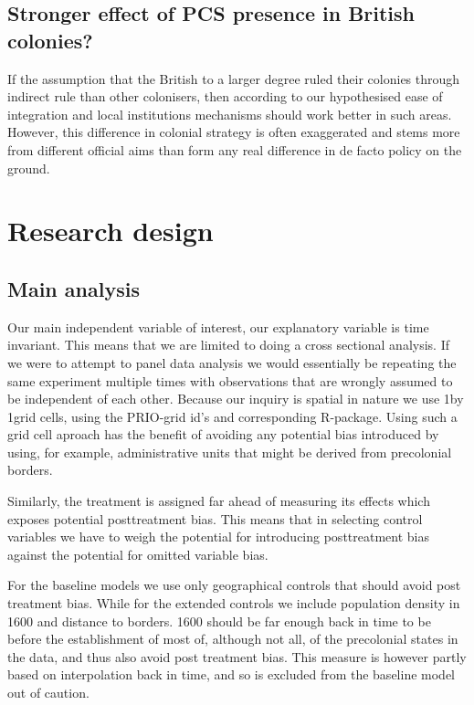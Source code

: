 \documentclass[12pt]{article}
\begin{document}


\subsection{Stronger effect of PCS presence in British colonies?}

If the assumption that the British to a larger degree ruled their colonies
through indirect rule than other colonisers, then according to our hypothesised
ease of integration and local institutions mechanisms should work better in such
areas. However, this difference in colonial strategy is often exaggerated and
stems more from different official aims than form any real difference in de
facto policy on the ground.

\section{Research design}
\subsection{Main analysis}
 
Our main independent variable of interest, our explanatory variable
is time invariant. This means that we are limited to doing a cross sectional
analysis. If we were to attempt to panel data analysis we would essentially be repeating the
same experiment multiple times with observations that are wrongly assumed to be
independent of each other. 
Because our inquiry is spatial in nature we use 1\degree by 1\degree grid cells,
using the PRIO-grid id's and corresponding R-package. Using such a grid cell
aproach has the benefit of avoiding any potential bias introduced by using, for
example, administrative units that might be derived from precolonial borders.

Similarly, the treatment is assigned far ahead of measuring its effects which
exposes potential posttreatment bias. This means that in selecting control
variables we have to weigh the potential for introducing posttreatment bias
against the potential for omitted variable bias. 

For the baseline models we use only geographical controls that should avoid post
treatment bias. While for the extended controls we include population density in
1600 and distance to borders. 1600 should be far enough back in time to be
before the establishment of most of, although not all, of the precolonial states
in the data, and thus also avoid post treatment bias. This measure is however
partly based on interpolation back in time, and so is excluded from the baseline
model out of caution. 
\end{document}
